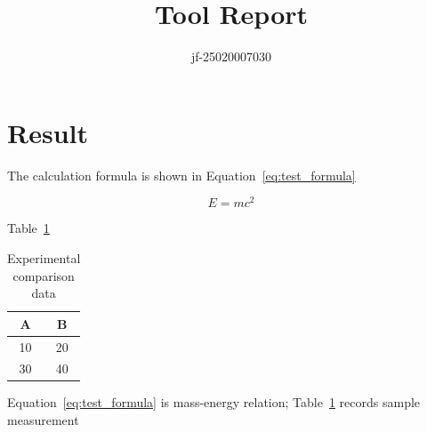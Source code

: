 \documentclass{article}
\begin{document}
\title{Tool Report}
\author{jf-25020007030}
\maketitle

\section{Result}

The calculation formula is shown in Equation~\eqref{eq:test_formula}

\begin{equation}
E=mc^2
\label{eq:test_formula}
\end{equation}

Table~\ref{tab:data_table}
\begin{table}[h]
\centering
\caption{Experimental comparison data}
\label{tab:data_table}
\begin{tabular}{|c|c|}
\hline
A & B \\
\hline
10 & 20 \\
\hline
30 & 40 \\
\hline
\end{tabular}
\end{table}

Equation~\eqref{eq:test_formula} is mass-energy relation; Table~\ref{tab:data_table} records sample measurement 
\end{document}
